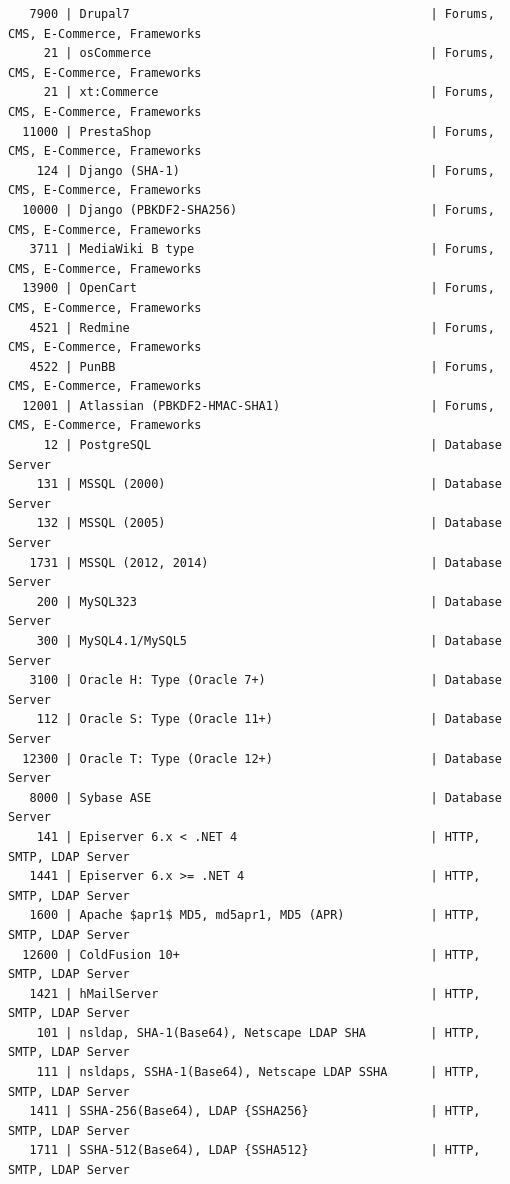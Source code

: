\documentclass{article}
\begin{document}
\begin{lstlisting}
   7900 | Drupal7                                          | Forums, CMS, E-Commerce, Frameworks
     21 | osCommerce                                       | Forums, CMS, E-Commerce, Frameworks
     21 | xt:Commerce                                      | Forums, CMS, E-Commerce, Frameworks
  11000 | PrestaShop                                       | Forums, CMS, E-Commerce, Frameworks
    124 | Django (SHA-1)                                   | Forums, CMS, E-Commerce, Frameworks
  10000 | Django (PBKDF2-SHA256)                           | Forums, CMS, E-Commerce, Frameworks
   3711 | MediaWiki B type                                 | Forums, CMS, E-Commerce, Frameworks
  13900 | OpenCart                                         | Forums, CMS, E-Commerce, Frameworks
   4521 | Redmine                                          | Forums, CMS, E-Commerce, Frameworks
   4522 | PunBB                                            | Forums, CMS, E-Commerce, Frameworks
  12001 | Atlassian (PBKDF2-HMAC-SHA1)                     | Forums, CMS, E-Commerce, Frameworks
     12 | PostgreSQL                                       | Database Server
    131 | MSSQL (2000)                                     | Database Server
    132 | MSSQL (2005)                                     | Database Server
   1731 | MSSQL (2012, 2014)                               | Database Server
    200 | MySQL323                                         | Database Server
    300 | MySQL4.1/MySQL5                                  | Database Server
   3100 | Oracle H: Type (Oracle 7+)                       | Database Server
    112 | Oracle S: Type (Oracle 11+)                      | Database Server
  12300 | Oracle T: Type (Oracle 12+)                      | Database Server
   8000 | Sybase ASE                                       | Database Server
    141 | Episerver 6.x < .NET 4                           | HTTP, SMTP, LDAP Server
   1441 | Episerver 6.x >= .NET 4                          | HTTP, SMTP, LDAP Server
   1600 | Apache $apr1$ MD5, md5apr1, MD5 (APR)            | HTTP, SMTP, LDAP Server
  12600 | ColdFusion 10+                                   | HTTP, SMTP, LDAP Server
   1421 | hMailServer                                      | HTTP, SMTP, LDAP Server
    101 | nsldap, SHA-1(Base64), Netscape LDAP SHA         | HTTP, SMTP, LDAP Server
    111 | nsldaps, SSHA-1(Base64), Netscape LDAP SSHA      | HTTP, SMTP, LDAP Server
   1411 | SSHA-256(Base64), LDAP {SSHA256}                 | HTTP, SMTP, LDAP Server
   1711 | SSHA-512(Base64), LDAP {SSHA512}                 | HTTP, SMTP, LDAP Server

\end{lstlisting}
\end{document}
